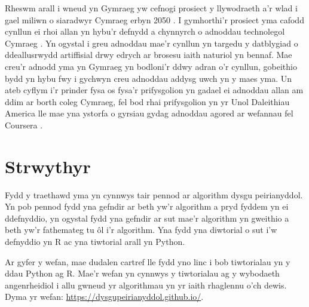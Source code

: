 Rheswm arall i wneud yn Gymraeg yw cefnogi prosiect y llywodraeth a'r wlad i gael miliwn o siaradwyr Cymraeg erbyn 2050 \cite{cymraeg2050}. I gymhorthi'r prosiect yma cafodd cynllun ei rhoi allan yn hybu'r defnydd a chynnyrch o adnoddau technolegol Cymraeg \cite{cymraeg2050tech}. Yn ogystal i greu adnoddau mae'r cynllun yn targedu y datblygiad o ddeallusrwydd artiffisial drwy edrych ar brosesu iaith naturiol yn bennaf. Mae creu'r adnodd yma yn Gymraeg yn bodloni'r ddwy adran o'r cynllun, gobeithio bydd yn hybu fwy i gychwyn creu adnoddau addysg uwch yn y maes yma. Un ateb cyflym i'r prinder fysa os fysa'r prifysgolion yn gadael ei adnoddau allan am ddim ar borth coleg Cymraeg, fel bod rhai prifysgolion yn yr Unol Daleithiau America lle mae yna ystorfa o gyrsiau gydag adnoddau agored ar wefannau fel Coursera \cite{coursera}.

\section{Strwythyr}

Fydd y traethawd yma yn cynnwys tair pennod ar algorithm dysgu peirianyddol. Yn pob pennod fydd yna gefndir ar beth yw'r algorithm a pryd fyddem yn ei ddefnyddio, yn ogystal fydd yna gefndir ar sut mae'r algorithm yn gweithio a beth yw'r fathemateg tu \^{o}l i'r algorithm. Yna fydd yna diwtorial o sut i'w defnyddio yn R ac yna tiwtorial arall yn Python.

Ar gyfer y wefan, mae dudalen cartref lle fydd yno linc i bob tiwtorialau yn y ddau Python ag R. Mae'r wefan yn cynnwys y tiwtorialau ag y wybodaeth angenrheidiol i allu gwneud yr algorithmau yn yr iaith rhaglennu o'ch dewis. Dyma yr wefan: \url{https://dysgupeirianyddol.github.io/}.

